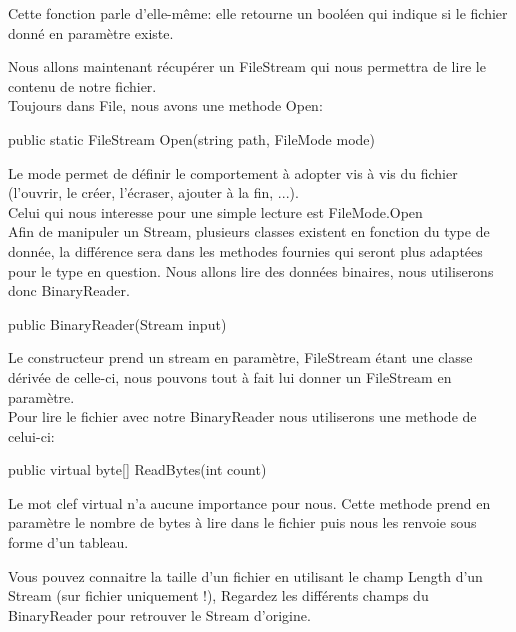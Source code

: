 Cette fonction parle d'elle-même: elle retourne un booléen qui indique si le fichier donné en paramètre existe.

Nous allons maintenant récupérer un FileStream qui nous permettra de lire le contenu de notre fichier.\\
Toujours dans File, nous avons une methode Open:
\begin{code}
public static FileStream Open(string path, FileMode mode)
\end{code}

Le mode permet de définir le comportement à adopter vis à vis du fichier (l'ouvrir, le créer, l'écraser, ajouter à la fin, ...).\\
Celui qui nous interesse pour une simple lecture est FileMode.Open\\
Afin de manipuler un Stream, plusieurs classes existent en fonction du type de donnée, la différence sera dans les methodes fournies qui seront plus adaptées pour le type en question. Nous allons lire des données binaires, nous utiliserons donc BinaryReader.

\begin{code}
public BinaryReader(Stream input)
\end{code}

Le constructeur prend un stream en paramètre, FileStream étant une classe dérivée de celle-ci, nous pouvons tout à fait lui donner un FileStream en paramètre.\\
Pour lire le fichier avec notre BinaryReader nous utiliserons une methode de celui-ci:

\begin{code}
public virtual byte[] ReadBytes(int count)
\end{code}

Le mot clef virtual n'a aucune importance pour nous. Cette methode prend en paramètre le nombre de bytes à lire dans le fichier puis nous les renvoie sous forme d'un tableau.

Vous pouvez connaitre la taille d'un fichier en utilisant le champ Length d'un Stream (sur fichier uniquement !), Regardez les différents champs du BinaryReader pour retrouver le Stream d'origine.

\newpage